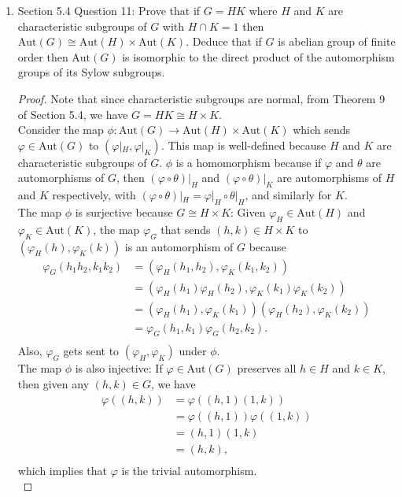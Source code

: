 \documentclass{article}
\begin{document}
\begin{enumerate}[label={\bf Q\arabic*:}]
  \item Section 5.4 Question 11: Prove that if $G=HK$ where $H$ and $K$ are
    characteristic subgroups of $G$ with $H\cap K=1$ then
    $\text{Aut}(G)\cong\text{Aut}(H)\times\text{Aut}(K)$. Deduce that if
    $G$ is abelian group of finite order then $\text{Aut}(G)$ is isomorphic
    to the direct product of the automorphism groups of its Sylow
    subgroups.

    \begin{proof}
      Note that since characteristic subgroups are normal, from Theorem 9
      of Section 5.4, we have $G=HK\cong H\times K$. \\

      Consider the map
      $\phi:\text{Aut}(G)\rightarrow\text{Aut}(H)\times\text{Aut}(K)$ which
      sends $\varphi\in\text{Aut}(G)$ to $(\varphi|_H,\varphi|_K)$. This
      map is well-defined because $H$ and $K$ are characteristic subgroups
      of $G$. $\phi$ is a homomorphism because if $\varphi$ and $\theta$
      are automorphisms of $G$, then $(\varphi\circ\theta)|_H$ and
      $(\varphi\circ\theta)|_K$ are automorphisms of $H$ and $K$
      respectively, with
      $(\varphi\circ\theta)|_H=\varphi|_H\circ\theta|_H$, and similarly for
      $K$. \\

      The map $\phi$ is surjective because $G\cong H\times K$: Given
      $\varphi_H\in\text{Aut}(H)$ and $\varphi_K\in\text{Aut}(K)$, the map
      $\varphi_G$ that sends $(h,k)\in H\times K$ to
      $(\varphi_H(h),\varphi_K(k))$ is an automorphism of $G$ because
      \begin{align*}
        \varphi_G(h_1h_2,k_1k_2)  &= (\varphi_H(h_1,h_2),\varphi_K(k_1,k_2)) \\
          &= (\varphi_H(h_1)\varphi_H(h_2),\varphi_K(k_1)\varphi_K(k_2)) \\
          &= (\varphi_H(h_1),\varphi_K(k_1))(\varphi_H(h_2),\varphi_K(k_2)) \\
          &= \varphi_G(h_1,k_1)\varphi_G(h_2,k_2). \\
      \end{align*}
      Also, $\varphi_G$ gets sent to $(\varphi_H,\varphi_K)$ under $\phi$.
      \\

      The map $\phi$ is also injective: If $\varphi\in\text{Aut}(G)$
      preserves all $h\in H$ and $k\in K$, then given any $(h,k)\in G$, we
      have
      \begin{align*}
        \varphi((h,k))  &= \varphi((h,1)(1,k)) \\
                        &= \varphi((h,1))\varphi((1,k)) \\
                        &= (h,1)(1,k) \\
                        &= (h,k), \\
      \end{align*}
      which implies that $\varphi$ is the trivial automorphism. \\


\end{proof}
\end{enumerate}
\end{document}
